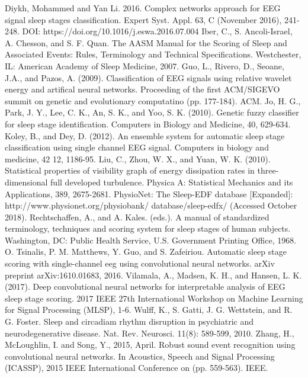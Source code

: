 \documentclass{amia}
\begin{document}
\makeatletter
\renewcommand{\@biblabel}[1]{\hfill #1.}
\makeatother




\begin{thebibliography}{1}
\setlength\itemsep{-0.1em}

Diykh, Mohammed and Yan Li. 2016. Complex networks approach for EEG signal sleep stages classification. Expert Syst. Appl. 63, C (November 2016), 241-248. DOI: https://doi.org/10.1016/j.eswa.2016.07.004 
Iber, C., S. Ancoli-Israel, A. Chesson, and S. F. Quan. The AASM Manual for the Scoring of Sleep and Associated Events: Rules, Terminology and Technical Specifications. Westchester, IL: American Academy of Sleep Medicine, 2007.
Guo, L., Rivero, D., Seoane, J.A., and Pazos, A. (2009). Classification of EEG signals using relative wavelet energy and artifical neural networks. Proceeding of the first ACM/SIGEVO summit on genetic and evolutionary computatino (pp. 177-184). ACM.
Jo, H. G., Park, J. Y., Lee, C. K., An, S. K., and Yoo, S. K. (2010). Genetic fuzzy classifier for sleep stage identification. Computers in Biology and Medicine, 40, 629-634.
Koley, B., and Dey, D. (2012). An ensemble system for automatic sleep stage classification using single channel EEG signal. Computers in biology and medicine, 42 12, 1186-95.
Liu, C., Zhou, W. X., and Yuan, W. K. (2010). Statistical properties of visibility graph of energy dissipation rates in three-dimensional full developed turbulence. Physica A: Statistical Mechanics and its Applications, 389, 2675-2681.
PhysioNet: The Sleep-EDF database [Expanded]: http://www.physionet.org/physiobank/ database/sleep-edfx/ (Accessed October 2018).
Rechtschaffen, A., and A. Kales. (eds.). A manual of standardized terminology, techniques and scoring system for sleep stages of human subjects. Washington, DC: Public Health Service, U.S. Government Printing Office, 1968.
O. Tsinalis, P. M. Matthews, Y. Guo, and S. Zafeiriou. Automatic sleep stage scoring with single-channel eeg using convolutional neural networks. arXiv preprint arXiv:1610.01683, 2016.
Vilamala, A., Madsen, K. H., and Hansen, L. K. (2017). Deep convolutional neural networks for interpretable analysis of EEG sleep stage scoring. 2017 IEEE 27th International Workshop on Machine Learning for Signal Processing (MLSP), 1-6.
Wulff, K., S. Gatti, J. G. Wettstein, and R. G. Foster. Sleep and circadiam rhythm disruption in psychiatric and neurodegenerative disease. Nat. Rev. Neurosci. 11(8): 589-599, 2010.
Zhang, H., McLoughlin, I. and Song, Y., 2015, April. Robust sound event recognition using convolutional neural networks. In Acoustics, Speech and Signal Processing (ICASSP), 2015 IEEE International Conference on (pp. 559-563). IEEE.




\end{thebibliography}
\end{document}
